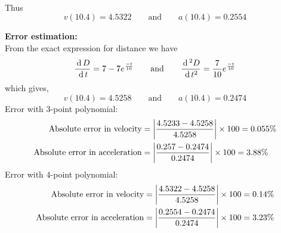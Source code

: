 \documentclass[12pt,class=book,crop=false]{standalone}
\begin{document}
\begin{soln}
\begin{enumerate}[label=(\alph*)]
\begin{align*}
              \end{align*}
              Thus
              \[
                  v(10.4)=4.5322 \qquad \text{and}\qquad a(10.4)=0.2554
              \]
    \end{enumerate}
    \textbf{Error estimation:}\\
    From the exact expression for distance we have
    \[
        \frac{\,\mathrm{d}\, D}{\,\mathrm{d}\, t}=7-7e^{\frac{-t}{10}}\qquad \text{and}\qquad	\frac{\,\mathrm{d}\,^2 D}{\,\mathrm{d}\, t^2}=\frac{7}{10} e^{\frac{-t}{10}}
    \]
    which gives,
    \[
        v(10.4)=4.5258 \qquad\text{and}\qquad a(10.4)=0.2474
    \]
    Error with 3-point polynomial:\\
    \begin{align*}
        \text{Absolute error in velocity}     & = \left\vert\frac{4.5233-4.5258}{4.5258}\right\vert\times 100=0.055\% \\
        \text{Absolute error in acceleration} & = \left\vert\frac{0.257-0.2474}{0.2474}\right\vert\times 100=3.88\%
    \end{align*}
    Error with 4-point polynomial:
    \begin{align*}
        \text{Absolute error in velocity}     & = \left\vert\frac{4.5322-4.5258}{4.5258}\right\vert\times 100=0.14\% \\
        \text{Absolute error in acceleration} & =\left\vert\frac{0.2554-0.2474}{0.2474}\right\vert\times 100=3.23\%
    \end{align*}
\end{soln}
\end{document}
